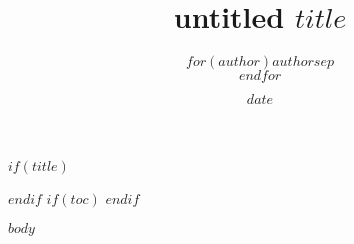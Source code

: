 \documentclass[11pt,letter,oneside,bibtotocnumbered,liststotocnumbered,pointlessnumbers,DIV=calc,BCOR=16mm]{scrreprt}
\title{ untitled }
\author{  }
\title{$title$}
\author{$for(author)$$author$$sep$\\$endfor$}
\date{$date$}
\begin{document}
$if(title)$
\maketitle
$endif$
$if(toc)$
\tableofcontents
\newpage
$endif$

$body$
\end{document}
